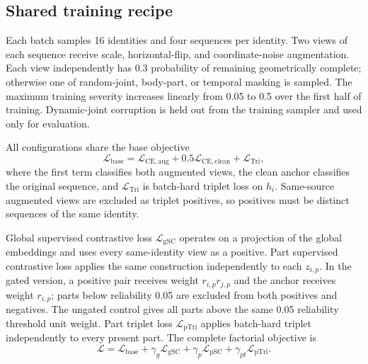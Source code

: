 \documentclass[pdflatex,iicol,sn-apa]{sn-jnl}
\newcommand{\Lbase}{\mathcal{L}_{\mathrm{base}}}
\newcommand{\Lglobal}{\mathcal{L}_{\mathrm{gSC}}}
\newcommand{\Lpart}{\mathcal{L}_{\mathrm{pSC}}}
\newcommand{\Lptrip}{\mathcal{L}_{\mathrm{pTri}}}
\begin{document}
\subsection{Shared training recipe}

Each batch samples 16 identities and four sequences per identity. Two views of
each sequence receive scale, horizontal-flip, and coordinate-noise augmentation.
Each view independently has 0.3 probability of remaining geometrically complete;
otherwise one of random-joint, body-part, or temporal masking is sampled. The
maximum training severity increases linearly from 0.05 to 0.5 over the first
half of training. Dynamic-joint corruption is held out from the training
sampler and used only for evaluation.

All configurations share the base objective
\begin{equation}
 \Lbase = \mathcal{L}_{\mathrm{CE,aug}}
 +0.5\mathcal{L}_{\mathrm{CE,clean}}
 +\mathcal{L}_{\mathrm{Tri}},
 \label{eq:base}
\end{equation}
where the first term classifies both augmented views, the clean anchor classifies
the original sequence, and $\mathcal{L}_{\mathrm{Tri}}$ is batch-hard triplet
loss \citep{hermans2017triplet} on $h_i$. Same-source augmented views are excluded
as triplet positives, so positives must be distinct sequences of the same
identity.

Global supervised contrastive loss $\Lglobal$ operates on a projection of the
global embeddings and uses every same-identity view as a positive. Part
supervised contrastive loss applies the same construction independently to each
$z_{i,p}$. In the gated version, a positive pair receives weight
$r_{i,p}r_{j,p}$ and the anchor receives weight $r_{i,p}$; parts below reliability
0.05 are excluded from both positives and negatives. The ungated control gives
all parts above the same 0.05 reliability threshold unit weight. Part triplet loss $\Lptrip$ applies batch-hard
triplet independently to every present part. The complete factorial objective
is
\begin{equation}
 \mathcal{L}=\Lbase+\gamma_g\Lglobal+\gamma_p\Lpart+
 \gamma_{pt}\Lptrip.
 \label{eq:factorial}
\end{equation}
\end{document}
